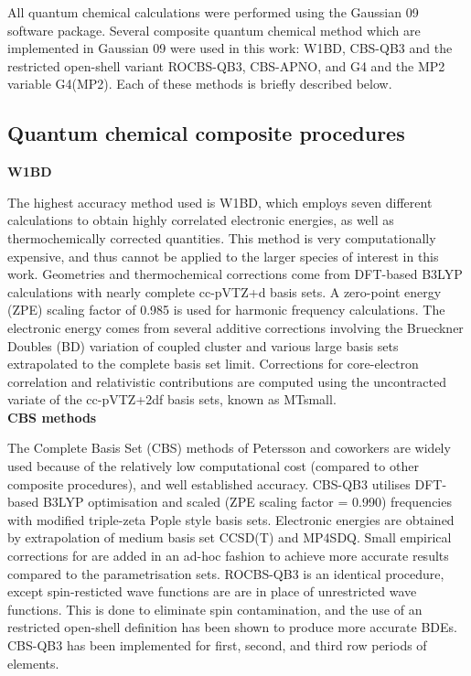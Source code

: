 All quantum chemical calculations were performed using the Gaussian 09 software package.\cite{Frisch2009} Several composite quantum chemical method which are implemented in Gaussian 09 were used in this work: W1BD, CBS-QB3 and the restricted open-shell variant ROCBS-QB3, CBS-APNO, and G4 and the MP2 variable G4(MP2). Each of these methods is briefly described below.


\subsection{Quantum chemical composite procedures}

\noindent \textbf{W1BD}

The highest accuracy method used is W1BD, which employs seven different calculations to obtain highly correlated electronic energies, as well as thermochemically corrected quantities. This method is very computationally expensive, and thus cannot be applied to the larger species of interest in this work. Geometries and thermochemical corrections come from DFT-based B3LYP calculations with nearly complete cc-pVTZ+d basis sets. A zero-point energy (ZPE) scaling factor of 0.985 is used for harmonic frequency calculations. The electronic energy comes from several additive corrections involving the Brueckner Doubles\cite{Barnes2009} (BD) variation of coupled cluster and various large basis sets extrapolated to the complete basis set limit. Corrections for core-electron correlation and relativistic contributions are computed using the uncontracted variate of the cc-pVTZ+2df basis sets, known as MTsmall.\cite{Martin1999}
\\

\noindent \textbf{CBS methods}

The Complete Basis Set (CBS) methods of Petersson and coworkers\cite{Montgomery1999, Montgomery2000, Ochterski1996, Wood2006} are widely used because of the relatively low computational cost (compared to other composite procedures), and well established accuracy.\cite{Somers2015, Simmie2015} CBS-QB3\cite{Montgomery1999, Montgomery2000} utilises DFT-based B3LYP optimisation and scaled (ZPE scaling factor = 0.990) frequencies with modified triple-zeta Pople style basis sets. Electronic energies are obtained by extrapolation of medium basis set CCSD(T) and MP4SDQ. Small empirical corrections for are added in an ad-hoc fashion to achieve more accurate results compared to the parametrisation sets.\cite{Petersson2001} ROCBS-QB3 is an identical procedure, except spin-resticted wave functions are are in place of unrestricted wave functions. This is done to eliminate spin contamination, and the use of an restricted open-shell definition has been shown to produce more accurate BDEs.\cite{DiLabio1999} CBS-QB3 has been implemented for first, second, and third row periods of elements.

